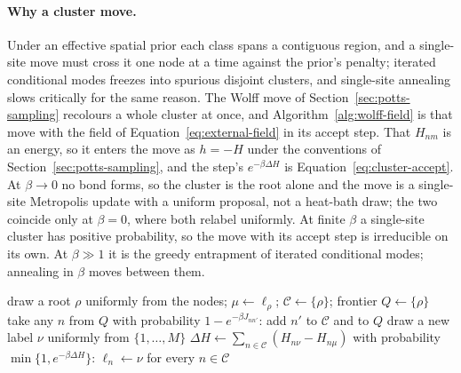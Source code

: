 \documentclass[11pt,a4paper]{article}
\begin{document}
\paragraph{Why a cluster move.}
Under an effective spatial prior each class spans a contiguous region, and a
single-site move must cross it one node at a time against the prior's penalty;
iterated conditional modes freezes into spurious disjoint clusters, and
single-site annealing slows critically for the same reason. The Wolff move of
Section~\ref{sec:potts-sampling} recolours a whole cluster at once, and
Algorithm~\ref{alg:wolff-field} is that move with the field of
Equation~\ref{eq:external-field} in its accept step. That $H_{nm}$ is an
energy, so it enters the move as $h = -H$ under the conventions of
Section~\ref{sec:potts-sampling}, and the step's $e^{-\beta \Delta H}$ is
Equation~\ref{eq:cluster-accept}. At $\beta \to 0$ no bond
forms, so the cluster is the root alone and the move is a single-site
Metropolis update with a uniform proposal, not a heat-bath draw; the two
coincide only at $\beta = 0$, where both relabel uniformly. At finite $\beta$
a single-site cluster has positive probability, so the move with its accept
step is irreducible on its own. At $\beta \gg 1$ it is the greedy entrapment
of iterated conditional modes; annealing in $\beta$ moves between them.

\begin{algorithm}[htbp]
\caption{One Wolff update on the labels, in the external field}
\label{alg:wolff-field}
\begin{algorithmic}[1]
\State draw a root $\rho$ uniformly from the nodes; $\mu \gets \ell_\rho$;
       $\mathcal{C} \gets \{\rho\}$; frontier $Q \gets \{\rho\}$
  \State take any $n$ from $Q$ 
    \State with probability $1 - e^{-\beta J_{nn'}}$: add $n'$ to $\mathcal{C}$ and to $Q$
  \EndFor
\EndWhile
\State draw a new label $\nu$ uniformly from $\{1, \dots, M\}$
\State $\Delta H \gets \sum_{n \in \mathcal{C}} (H_{n\nu} - H_{n\mu})$
\State with probability $\min\{1, e^{-\beta \Delta H}\}$: $\ell_n \gets \nu$ for every $n \in \mathcal{C}$
\end{algorithmic}
\end{algorithm}
\end{document}
